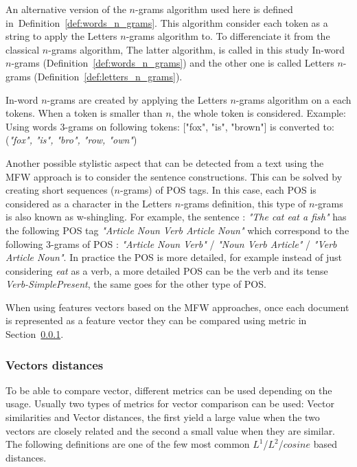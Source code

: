 An alternative version of the $n$-grams algorithm used here is defined in~Definition~\ref{def:words_n_grams}.
This algorithm consider each token as a string to apply the Letters $n$-grams algorithm to.
To differenciate it from the classical $n$-grams algorithm,
The latter algorithm, is called in this study In-word $n$-grams (Definition~\ref{def:words_n_grams}) and the other one is  called Letters $n$-grams (Definition~\ref{def:letters_n_grams}).

\begin{definition}
  \label{def:words_n_grams}
  In-word $n$-grams are created by applying the Letters $n$-grams algorithm on a each tokens.
  When a token is smaller than $n$, the whole token is considered.
  Example: Using words 3-grams on following tokens: ["fox", "is", "brown"] is converted to: (\textit{"fox", "is", "bro", "row, "own"})
\end{definition}

Another possible stylistic aspect that can be detected from a text using the MFW approach is to consider the sentence constructions.
This can be solved by creating short sequences ($n$-grams) of POS tags.
In this case, each POS is considered as a character in the Letters $n$-grams definition, this type of $n$-grams is also known as w-shingling.
For example, the sentence : \textit{"The cat eat a fish"} has the following POS tag \textit{"Article Noun Verb Article Noun"} which correspond to the following 3-grams of POS : \textit{"Article Noun Verb"} / \textit{"Noun Verb Article"} / \textit{"Verb Article Noun"}.
In practice the POS is more detailed, for example instead of just considering \textit{eat} as a verb, a more detailed POS can be the verb and its tense \textit{Verb-SimplePresent}, the same goes for the other type of POS.

When using features vectors based on the MFW approaches, once each document is represented as a feature vector they can be compared using metric in Section~\ref{sec:fv_distances}.

\subsubsection{Vectors distances}
\label{sec:fv_distances}

To be able to compare vector, different metrics can be used depending on the usage.
Usually two types of metrics for vector comparison can be used: Vector similarities and Vector distances, the first yield a large value when the two vectors are closely related and the second a small value when they are similar.
The following definitions are one of the few most common $L^1$/$L^2$/$cosine$ based distances.

